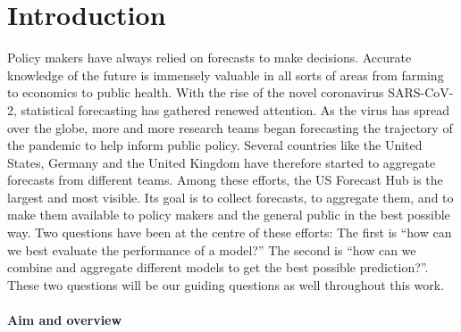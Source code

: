 \documentclass[
]{book}
\begin{document}
\hypertarget{intro}{%
\chapter{Introduction}\label{intro}}

Policy makers have always relied on forecasts to make decisions. Accurate knowledge of the future is immensely valuable in all sorts of areas from farming to economics to public health. With the rise of the novel coronavirus SARS-CoV-2, statistical forecasting has gathered renewed attention. As the virus has spread over the globe, more and more research teams began forecasting the trajectory of the pandemic to help inform public policy. Several countries like the United States, Germany and the United Kingdom have therefore started to aggregate forecasts from different teams. Among these efforts, the US Forecast Hub \citep{umass-amherstinfluenzaforecastingcenterofexcellenceCovid19forecasthubOrg2020} is the largest and most visible. Its goal is to collect forecasts, to aggregate them, and to make them available to policy makers and the general public in the best possible way. Two questions have been at the centre of these efforts: The first is ``how can we best evaluate the performance of a model?'' The second is ``how can we combine and aggregate different models to get the best possible prediction?''. These two questions will be our guiding questions as well throughout this work.

\hypertarget{aim-and-overview}{%
\subsubsection*{Aim and overview}\label{aim-and-overview}}
\end{document}
